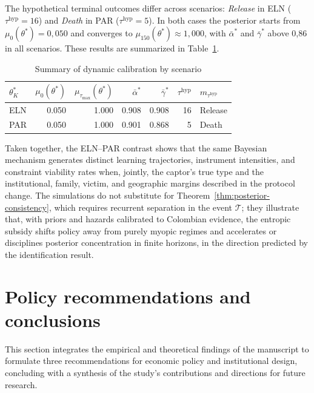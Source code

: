 \documentclass[ecta,nameyear,draft]{econsocart}
\theoremstyle{plain}
\theoremstyle{definition}
\newcommand{\1}{\mathbf{1}}
\begin{document}
The hypothetical terminal outcomes differ across scenarios: \emph{Release} in ELN ($\tau^{\mathrm{hyp}}=16$) and \emph{Death} in PAR ($\tau^{\mathrm{hyp}}=5$). In both cases the posterior starts from $\mu_0(\theta^\ast)=0{,}050$ and converges to $\mu_{150}(\theta^\ast)\approx 1{,}000$, with $\bar\alpha^\ast$ and $\bar\gamma^\ast$ above 0{,}86 in all scenarios. These results are summarized in Table~\ref{tab:calibracion-resumen}.

\begin{table}[htbp]
\centering
\caption{Summary of dynamic calibration by scenario}
\label{tab:calibracion-resumen}
\small
\begin{tabular}{lrrrrrl}
\toprule
$\theta_K^\ast$ & $\mu_0(\theta^\ast)$ & $\mu_{\tau_{\max}}(\theta^\ast)$ & $\bar{\alpha}^\ast$ & $\bar{\gamma}^\ast$ & $\tau^{\mathrm{hyp}}$ & $m_{\tau^{\mathrm{hyp}}}$ \\
\midrule
ELN & 0.050 & 1.000 & 0.908 & 0.908 & 16 & Release \\
PAR & 0.050 & 1.000 & 0.901 & 0.868 & 5 & Death \\
\bottomrule
\end{tabular}
\end{table}

Taken together, the ELN--PAR contrast shows that the same Bayesian mechanism generates distinct learning trajectories, instrument intensities, and constraint viability rates when, jointly, the captor's true type and the institutional, family, victim, and geographic margins described in the protocol change. The simulations do not substitute for Theorem~\ref{thm:posterior-consistency}, which requires recurrent separation in the event $\mathcal{T}$; they illustrate that, with priors and hazards calibrated to Colombian evidence, the entropic subsidy shifts policy away from purely myopic regimes and accelerates or disciplines posterior concentration in finite horizons, in the direction predicted by the identification result.

\section{Policy recommendations and conclusions}\label{sec:conclusiones}

This section integrates the empirical and theoretical findings of the manuscript to formulate three recommendations for economic policy and institutional design, concluding with a synthesis of the study's contributions and directions for future research.
\end{document}
